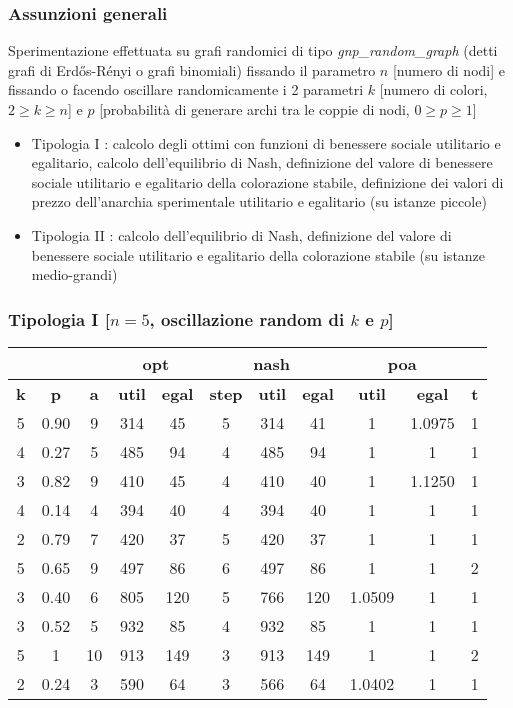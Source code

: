 \documentclass{beamer}
\begin{document}
\begin{frame}
\frametitle{Assunzioni generali}
Sperimentazione effettuata su \alert{grafi randomici} di tipo \textit{gnp\_random\_graph} (detti grafi di Erdős-Rényi o grafi binomiali) fissando il parametro \alert{$n$} [\alert{numero di nodi}] e fissando o facendo oscillare randomicamente i 2 parametri \alert{$k$} [\alert{numero di colori}, $2 \geq k \geq n$] e \alert{$p$} [\alert{probabilità di generare archi tra le coppie di nodi}, $0 \geq p \geq 1$]
\begin{itemize}
	\item \alert{Tipologia I} : calcolo degli ottimi con funzioni di benessere sociale utilitario e egalitario, calcolo dell'equilibrio di Nash, definizione del valore di benessere sociale utilitario e egalitario della colorazione stabile, definizione dei valori di prezzo dell'anarchia sperimentale utilitario e egalitario (su istanze piccole)
	\item \alert{Tipologia II} : calcolo dell'equilibrio di Nash, definizione del valore di benessere sociale utilitario e egalitario della colorazione stabile (su istanze medio-grandi)
\end{itemize}
\end{frame}


\begin{frame}
\frametitle{Tipologia I [$n=5$, oscillazione random di $k$ e $p$]}
\begin{table}[H]
\centering
\scalebox{0.9} {
\begin{tabular}{|c|c|c|c|c|c|c|c|c|c|c|}
\hline
\multicolumn{3}{|c|}{\textbf{}} & \multicolumn{2}{c|}{\textbf{\color{orange}opt}} & \multicolumn{3}{c|}{\textbf{\color{orange}nash}} & \multicolumn{2}{c|}{\textbf{\color{orange}poa}} & \textbf{} \\ \hline
\textbf{\alert{k}} & \textbf{\alert{p}} & \textbf{a} & \textbf{util} & \textbf{egal} & \textbf{step} & \textbf{util} & \textbf{egal} & \textbf{util} & \textbf{egal} & \textbf{t} \\ \hline
5 & 0.90 & 9 & 314 & 45 & 5 & 314 & 41 & 1 & 1.0975 & 1 \\ \hline
4 & 0.27 & 5 & 485 & 94 & 4 & 485 & 94 & 1 & 1 & 1 \\ \hline
3 & 0.82 & 9 & 410 & 45 & 4 & 410 & 40 & 1 & 1.1250 & 1 \\ \hline
4 & 0.14 & 4 & 394 & 40 & 4 & 394 & 40 & 1 & 1 & 1 \\ \hline
2 & 0.79 & 7 & 420 & 37 & 5 & 420 & 37 & 1 & 1 & 1 \\ \hline
5 & 0.65 & 9 & 497 & 86 & 6 & 497 & 86 & 1 & 1 & 2 \\ \hline
3 & 0.40 & 6 & 805 & 120 & 5 & 766 & 120 & 1.0509 & 1 & 1 \\ \hline
3 & 0.52 & 5 & 932 & 85 & 4 & 932 & 85 & 1 & 1 & 1 \\ \hline
5 & 1 & 10 & 913 & 149 & 3 & 913 & 149 & 1 & 1 & 2 \\ \hline
2 & 0.24 & 3 & 590 & 64 & 3 & 566 & 64 & 1.0402 & 1 & 1 \\ \hline
\end{tabular}
}
\end{table}
\end{frame}
\end{document}
